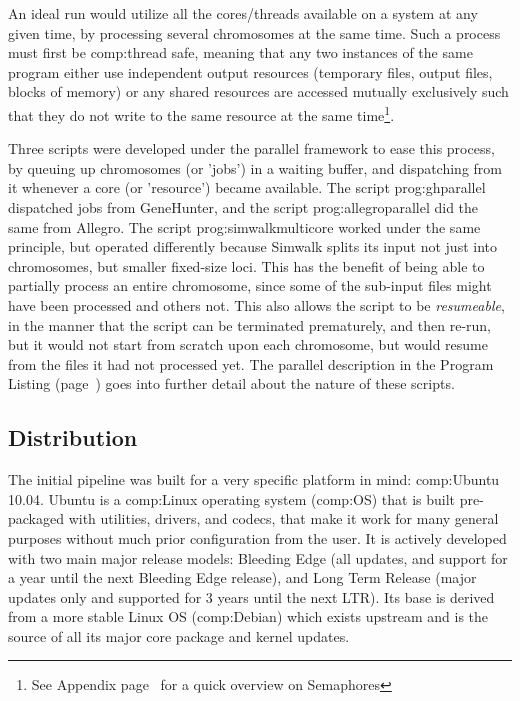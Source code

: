 An ideal run would utilize all the cores/threads available on a system at any given time, by processing several chromosomes at the same time. Such a process must first be \gls{comp:thread safe}, meaning that any two instances of the same program either use independent output resources (temporary files, output files, blocks of memory) or any shared resources are accessed mutually exclusively such that they do not write to the same resource at the same time\footnote{See Appendix page~\pageref{ref:app:semaphores} for a quick overview on Semaphores}.

Three scripts were developed under the parallel framework to ease this process, by queuing up chromosomes (or 'jobs') in a waiting buffer, and dispatching from it whenever a core (or 'resource') became available. The script \gls{prog:ghparallel} dispatched jobs from GeneHunter, and the script \gls{prog:allegroparallel} did the same from Allegro. The script \gls{prog:simwalkmulticore}\label{ref:meth:simwalkmulti} worked under the same principle, but operated differently because Simwalk splits its input not just into chromosomes, but smaller fixed-size loci. This has the benefit of being able to partially process an entire chromosome, since some of the sub-input files might have been processed and others not. This also allows the script to be \textit{resumeable}, in the manner that the script can be terminated prematurely, and then re-run, but it would not start from scratch upon each chromosome, but would resume from the files it had not processed yet. The parallel description in the Program Listing (page~\pageref{ref:meth:proglist}) goes into further detail about the nature of these scripts.

\subsection{Distribution}

The initial pipeline was built for a very specific platform in mind: \gls{comp:Ubuntu} 10.04. Ubuntu is a \gls{comp:Linux} operating system (\gls{comp:OS}) that is built pre-packaged with utilities, drivers, and codecs, that make it work for many general purposes without much prior configuration from the user. It is actively developed with two main major release models: Bleeding Edge (all updates, and support for a year until the next Bleeding Edge release), and Long Term Release (major updates only and supported for 3 years until the next LTR). Its base is derived from a more stable Linux OS (\gls{comp:Debian}) which exists upstream and is the source of all its major core package and kernel updates.

